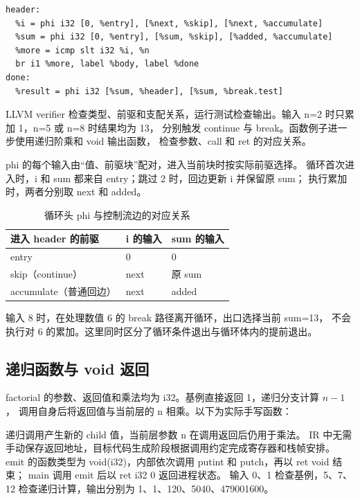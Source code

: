\par\vspace{0.7\baselineskip}\noindent\begin{minipage}[t]{\linewidth}
\begin{lstlisting}
header:
  %i = phi i32 [0, %entry], [%next, %skip], [%next, %accumulate]
  %sum = phi i32 [0, %entry], [%sum, %skip], [%added, %accumulate]
  %more = icmp slt i32 %i, %n
  br i1 %more, label %body, label %done
done:
  %result = phi i32 [%sum, %header], [%sum, %break.test]
\end{lstlisting}
\end{minipage}\par\vspace{0.5\baselineskip}
LLVM verifier 检查类型、前驱和支配关系，运行测试检查输出。输入 n=2 时只累加 1，n=5 或 n=8 时结果均为 13，
分别触发 continue 与 break。函数例子进一步使用递归阶乘和 void 输出函数，
检查参数、call 和 ret 的对应关系。

phi 的每个输入由“值、前驱块”配对，进入当前块时按实际前驱选择。
循环首次进入时，i 和 sum 都来自 entry；跳过 2 时，回边更新 i 并保留原 sum；
执行累加时，两者分别取 next 和 added。

\begin{table}[htbp]
\centering\small
\caption{循环头 phi 与控制流边的对应关系}
\begin{tabular}{lll}
\toprule
进入 header 的前驱 & i 的输入 & sum 的输入\\
\midrule
entry & 0 & 0\\
skip（continue） & next & 原 sum\\
accumulate（普通回边） & next & added\\
\bottomrule
\end{tabular}
\end{table}

输入 8 时，在处理数值 6 的 break 路径离开循环，出口选择当前 sum=13，
不会执行对 6 的累加。这里同时区分了循环条件退出与循环体内的提前退出。

\subsection{递归函数与 void 返回}
factorial 的参数、返回值和乘法均为 i32。基例直接返回 1，递归分支计算 $n-1$，
调用自身后将返回值与当前层的 n 相乘。以下为实际手写函数：
\par\vspace{0.7\baselineskip}\noindent\begin{minipage}[t]{\linewidth}

\end{minipage}\par\vspace{0.5\baselineskip}
递归调用产生新的 child 值，当前层参数 n 在调用返回后仍用于乘法。
IR 中无需手动保存返回地址，目标代码生成阶段根据调用约定完成寄存器和栈帧安排。
emit 的函数类型为 void(i32)，内部依次调用 putint 和 putch，再以 ret void 结束；
main 调用 emit 后以 ret i32 0 返回进程状态。
输入 0、1 检查基例，5、7、12 检查递归计算，输出分别为 1、1、120、5040、479001600。

